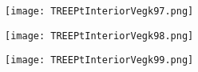\documentclass[pdf]{beamer}
\begin{document}
\begin{frame}
\begin{figure}[!h]
\centering
\texttt{[image: TREEPtInteriorVegk97.png]}
\end{figure}
\end{frame}

\begin{frame}
\begin{figure}[!h]
\centering
\texttt{[image: TREEPtInteriorVegk98.png]}
\end{figure}
\end{frame}

\begin{frame}
\begin{figure}[!h]
\centering
\texttt{[image: TREEPtInteriorVegk99.png]}
\end{figure}
\end{frame}
\end{document}
